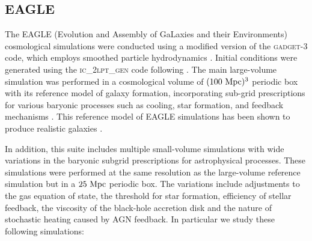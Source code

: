 \subsection{EAGLE}
\label{sec:sims-EAGLE}
The EAGLE (Evolution and Assembly of GaLaxies and their Environments) cosmological simulations were conducted using a modified version of the \textsc{gadget-3} code, which employs smoothed particle hydrodynamics \citep[][]{2005MNRAS.364.1105S}. Initial conditions were generated using the \textsc{ic\_2lpt\_gen} code following \cite{2010MNRAS.403.1859J}. The main large-volume simulation was performed in a cosmological volume of $(100 ~\rm{Mpc})^3$ periodic box with its reference model of galaxy formation, incorporating sub-grid prescriptions for various baryonic processes such as cooling, star formation, and feedback mechanisms \citep[][]{2015MNRAS.446..521S,2015MNRAS.450.1937C}. This reference model of EAGLE simulations has been shown to produce realistic galaxies \citep[][]{2015MNRAS.448.2941S,2015MNRAS.450.4486F,2015MNRAS.452.2879T}. 

In addition, this suite includes multiple small-volume simulations with wide variations in the baryonic subgrid prescriptions for astrophysical processes. These simulations were performed at the same resolution as the large-volume reference simulation but in a $25 ~\rm{Mpc}$ periodic box. The variations include adjustments to the gas equation of state, the threshold for star formation, efficiency of stellar feedback, the viscosity of the black-hole accretion disk and the nature of stochastic heating caused by AGN feedback. In particular we study these following simulations:

